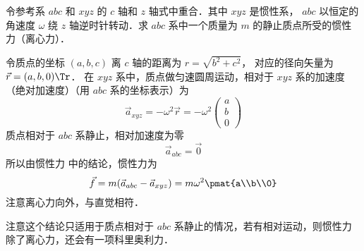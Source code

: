 

令参考系 $abc$ 和 $xyz$ 的 $c$ 轴和 $z$ 轴式中重合．其中 $xyz$ 是惯性系， $abc$ 以恒定的角速度 $\omega$ 绕 $z$ 轴逆时针转动．求 $abc$ 系中一个质量为 $m$ 的静止质点所受的惯性力（离心力）．

令质点的坐标 $(a,b,c)$ 离 $c$ 轴的距离为 $r = \sqrt {b^2 + c^2}$， 对应的径向矢量为 $\vec r = (a,b,0)\Tr$． 在 $xyz$ 系中，质点做匀速圆周运动，相对于 $xyz$ 系的加速度（绝对加速度）（用 $abc$ 系的坐标表示）为
\begin{equation}
{\vec a_{xyz}} =  - {\omega ^2}\vec r =  - {\omega ^2}\begin{pmatrix} a\\b\\0 \end{pmatrix}
\end{equation}
质点相对于 $abc$ 系静止，相对加速度为零
\begin{equation}
{\vec a_{abc}} = \vec 0
\end{equation}
所以由惯性力 中的结论，惯性力为
\begin{equation}
\vec f = m(\vec a_{abc} - \vec a_{xyz} ) = m\omega ^2\pmat{a\\b\\0}
\end{equation}
注意离心力向外，与直觉相符．

注意这个结论只适用于质点相对于 $abc$ 系静止的情况，若有相对运动，则惯性力除了离心力，还会有一项科里奥利力．